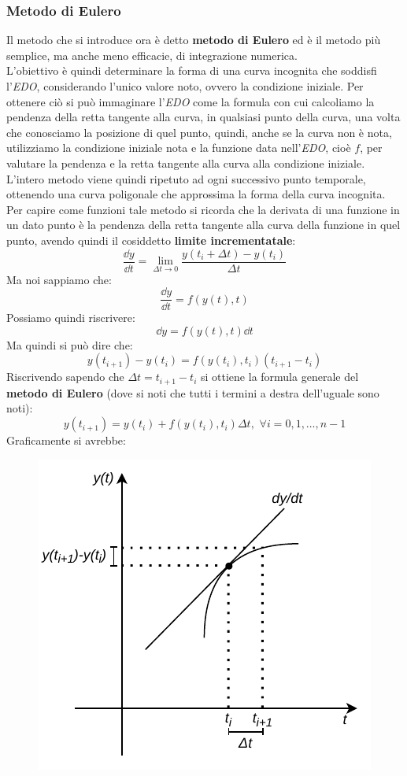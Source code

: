 \documentclass[a4paper,12pt, oneside]{book}
\begin{document}
\subsubsection{Metodo di Eulero}
Il metodo che si introduce ora è detto \textbf{metodo di Eulero} ed è il metodo
più semplice, ma anche meno efficacie, di integrazione numerica.\\
L'obiettivo è quindi determinare la forma di una curva incognita che soddisfi
l'\textit{EDO}, considerando l'unico valore noto, ovvero la condizione
iniziale. Per ottenere ciò si può immaginare l'\textit{EDO} come la formula con
cui calcoliamo la pendenza della retta tangente alla curva, in qualsiasi punto
della curva, una volta che conosciamo la posizione di quel punto, quindi, anche
se la curva non è nota, utilizziamo la condizione iniziale nota e la funzione
data nell'\textit{EDO}, cioè $f$, per valutare la pendenza e la retta tangente
alla curva alla condizione iniziale. L'intero metodo viene quindi ripetuto ad
ogni successivo punto temporale, ottenendo una curva poligonale che approssima
la forma della curva incognita. \\
Per capire come funzioni tale metodo si ricorda che la derivata di una funzione
in un dato punto è la pendenza della retta tangente alla curva della funzione in
quel punto, avendo quindi il cosiddetto \textbf{limite incrementatale}:
\[\frac{\dd{y}}{\dd{t}}=\lim_{\Delta t\to 0}\frac{y(t_i+\Delta t)-y(t_i)}{\Delta
    t}\]
Ma noi sappiamo che:
\[\frac{\dd{y}}{\dd{t}}=f(y(t),t)\]
Possiamo quindi riscrivere:
\[\dd{y}=f(y(t),t)\dd{t}\]
Ma quindi si può dire che:
\[y(t_{i+1})-y(t_i)=f(y(t_i),t_i)(t_{i+1}-t_i)\]
Riscrivendo sapendo che $\Delta t=t_{i+1}-t_i$ si ottiene la formula generale del
\textbf{metodo di Eulero} (dove si noti che tutti i termini a destra dell'uguale
sono noti):
\[y(t_{i+1})=y(t_i)+f(y(t_i),t_i)\Delta t,\,\,\forall i = 0,1,\ldots, n-1\]
Graficamente si avrebbe:
\begin{figure}[H]
  \centering
  \includegraphics[scale = 0.8]{img/edo2.pdf}
\end{figure}
\end{document}
